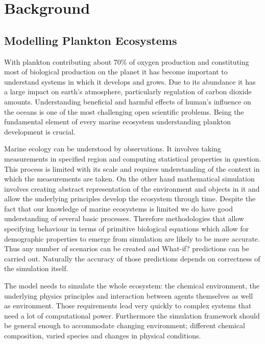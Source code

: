 \documentclass[12pt, a4paper]{report}
\begin{document}
\chapter{Background}\label{ch:bkg}

\section{Modelling Plankton Ecosystems}\label{sec:model-plankton-eco}

With plankton contributing about 70\% of oxygen production and
constituting most of biological production on the planet it has
become important to understand systems in which it develops and
grows. Due to its abundance it has a large impact on earth's
atmosphere, particularly regulation of carbon dioxide amounts.
Understanding beneficial and harmful effects of human's influence
on the oceans is one of the most challenging open scientific
problems. Being the fundamental element of every marine ecosystem
understanding plankton development is crucial.

Marine ecology can be understood by observations. It involves
taking measurements in specified region and computing statistical
properties in question. This process is limited with its scale
and requires understanding of the context in which the measurements
are taken. On the other hand mathematical simulation involves creating
abstract representation of the environment and objects in it and
allow the underlying principles develop the ecosystem through time.
Despite the fact that our knowledge of marine ecosystems is limited
we do have good understanding of several basic processes. Therefore
methodologies that allow specifying behaviour in terms of primitive
biological equations which allow for demographic properties to emerge
from simulation are likely to be more accurate. Thus any number of
scenarios can be created and What-if? predictions can be carried out.
Naturally the accuracy of those predictions depends on correctness
of the simulation itself.

The model needs to simulate the whole ecosystem: the chemical environment,
the underlying physics principles and interaction between agents themselves
as well as environment. Those requirements lead very quickly to complex systems
that need a lot of computational power. Furthermore the simulation framework
should be general enough to accommodate changing environment; different chemical composition,
varied species and changes in physical conditions.
\end{document}
